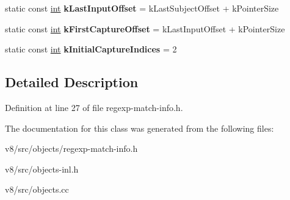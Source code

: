 \begin{DoxyCompactItemize}
static const \mbox{\hyperlink{classint}{int}} {\bfseries k\+Last\+Input\+Offset} = k\+Last\+Subject\+Offset + k\+Pointer\+Size
\item 
\mbox{\label{classv8_1_1internal_1_1RegExpMatchInfo_a12b2c982d57649478c4589024057dc0f}} 
static const \mbox{\hyperlink{classint}{int}} {\bfseries k\+First\+Capture\+Offset} = k\+Last\+Input\+Offset + k\+Pointer\+Size
\item 
\mbox{\label{classv8_1_1internal_1_1RegExpMatchInfo_a66247ac1e380b8737934b7ac8ba16f65}} 
static const \mbox{\hyperlink{classint}{int}} {\bfseries k\+Initial\+Capture\+Indices} = 2
\end{DoxyCompactItemize}


\subsection{Detailed Description}


Definition at line 27 of file regexp-\/match-\/info.\+h.



The documentation for this class was generated from the following files\+:\begin{DoxyCompactItemize}
\item 
v8/src/objects/regexp-\/match-\/info.\+h\item 
v8/src/objects-\/inl.\+h\item 
v8/src/objects.\+cc\end{DoxyCompactItemize}
